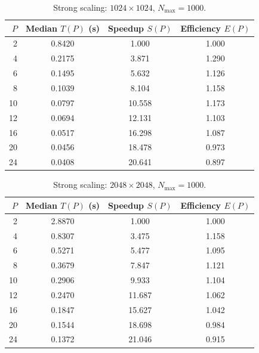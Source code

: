 \documentclass[11pt]{article}
\begin{document}
\begin{table}[H]
  \centering
  \caption{Strong scaling: $1024 \times 1024$, $N_{\max} = 1000$.}
  \label{tab:ss_1024}
  \begin{tabular}{rccc}
    \toprule
    \textbf{$P$} & \textbf{Median $T(P)$ (s)} & \textbf{Speedup $S(P)$} & \textbf{Efficiency $E(P)$} \\
    \midrule
    2  & 0.8420 & 1.000 & 1.000 \\
    4  & 0.2175 & 3.871 & 1.290 \\
    6  & 0.1495 & 5.632 & 1.126 \\
    8  & 0.1039 & 8.104 & 1.158 \\
    10 & 0.0797 & 10.558 & 1.173 \\
    12 & 0.0694 & 12.131 & 1.103 \\
    16 & 0.0517 & 16.298 & 1.087 \\
    20 & 0.0456 & 18.478 & 0.973 \\
    24 & 0.0408 & 20.641 & 0.897 \\
    \bottomrule
  \end{tabular}
\end{table}

\begin{table}[H]
  \centering
  \caption{Strong scaling: $2048 \times 2048$, $N_{\max} = 1000$.}
  \label{tab:ss_2048}
  \begin{tabular}{rccc}
    \toprule
    \textbf{$P$} & \textbf{Median $T(P)$ (s)} & \textbf{Speedup $S(P)$} & \textbf{Efficiency $E(P)$} \\
    \midrule
    2  & 2.8870 & 1.000  & 1.000 \\
    4  & 0.8307 & 3.475  & 1.158 \\
    6  & 0.5271 & 5.477  & 1.095 \\
    8  & 0.3679 & 7.847  & 1.121 \\
    10 & 0.2906 & 9.933  & 1.104 \\
    12 & 0.2470 & 11.687 & 1.062 \\
    16 & 0.1847 & 15.627 & 1.042 \\
    20 & 0.1544 & 18.698 & 0.984 \\
    24 & 0.1372 & 21.046 & 0.915 \\
    \bottomrule
  \end{tabular}
\end{table}
\end{document}

